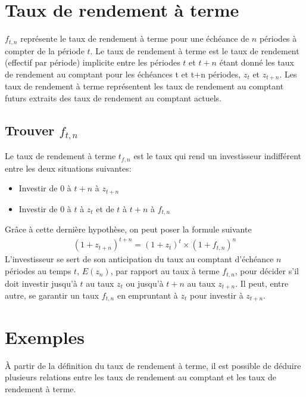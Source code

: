 \documentclass[12pt]{article}
\begin{document}
\section{Taux de rendement à terme}
$f_{t,n}$ représente le taux de rendement à terme pour une échéance de $n$ périodes à compter de la période $t$.  Le taux de rendement à terme est le taux de rendement (effectif par période) implicite entre les périodes $t$ et $t+n$ étant donné les taux de rendement au comptant pour les échéances t et t+n périodes,  $z_t$ et $z_{t+n}$.  Les taux de rendement à terme représentent les taux de rendement au comptant futurs extraits des taux de rendement au comptant actuels.
\subsection{Trouver $f_{t,n}$}
Le taux de rendement à terme $t_{f,n}$ est le taux qui rend un investisseur indifférent entre les deux situations suivantes:
\begin{itemize}
\item Investir de $0$ à $t+n$ à $z_{t+n}$
\item Investir de $0$ à $t$ à $z_t$ et de $t$ à $t+n$ à $f_{t,n}$
\end{itemize}
Grâce à cette dernière hypothèse, on peut poser la formule suivante
\begin{align*}
(1+z_{t+n})^{t+n}=(1+z_t)^t \times (1+f_{t,n})^n
\end{align*}
L’investisseur se sert de son anticipation du taux au comptant d’échéance $n$ périodes au temps $t$,  $E(z_n)$,  par rapport au taux à terme $f_{t,n}$,  pour décider s’il doit investir jusqu’à $t$ au taux $z_t$ ou jusqu’à $t+n$ au taux $z_{t+n}$.  Il peut,  entre autre,  se garantir un taux $f_{t,n}$ en empruntant à $z_t$ pour investir à $z_{t+n}$.
\newpage
\section{Exemples}
À partir de la définition du taux de rendement à terme,  il est possible de déduire plusieurs relations entre les taux de rendement au comptant et les taux de rendement à terme.
\end{document}
